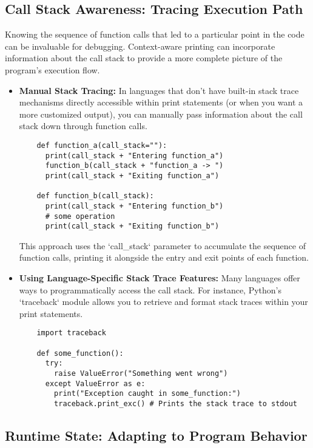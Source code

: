 \documentclass{article}
\begin{document}
{{{\subsection*{Call Stack Awareness: Tracing Execution Path}

Knowing the sequence of function calls that led to a particular point in the code can be invaluable for debugging. Context-aware printing can incorporate information about the call stack to provide a more complete picture of the program's execution flow.

\begin{itemize}
    \item \textbf{Manual Stack Tracing:} In languages that don't have built-in stack trace mechanisms directly accessible within print statements (or when you want a more customized output), you can manually pass information about the call stack down through function calls.
    \begin{verbatim}
    def function_a(call_stack=""):
      print(call_stack + "Entering function_a")
      function_b(call_stack + "function_a -> ")
      print(call_stack + "Exiting function_a")

    def function_b(call_stack):
      print(call_stack + "Entering function_b")
      # some operation
      print(call_stack + "Exiting function_b")
    \end{verbatim}
    This approach uses the `call_stack` parameter to accumulate the sequence of function calls, printing it alongside the entry and exit points of each function.
    \item \textbf{Using Language-Specific Stack Trace Features:} Many languages offer ways to programmatically access the call stack.  For instance, Python's `traceback` module allows you to retrieve and format stack traces within your print statements.
    \begin{verbatim}
    import traceback

    def some_function():
      try:
        raise ValueError("Something went wrong")
      except ValueError as e:
        print("Exception caught in some_function:")
        traceback.print_exc() # Prints the stack trace to stdout
    \end{verbatim}
\end{itemize}

\subsection*{Runtime State: Adapting to Program Behavior}

}}}
\end{document}
